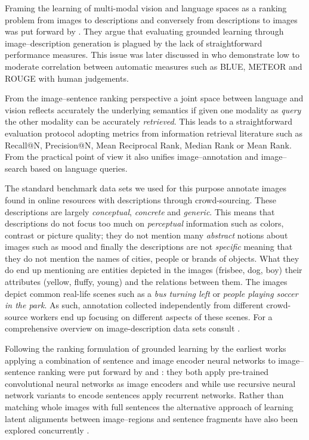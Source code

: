 Framing the learning of multi-modal vision and language spaces as a ranking problem
from images to descriptions and conversely from descriptions to images was
put forward by \cite{hodosh2013framing}.
They argue that evaluating grounded learning through image--description generation
is plagued by the lack of straightforward performance measures.
This issue was later discussed in \cite{elliott2014comparing} who demonstrate low to moderate correlation
between automatic measures such as BLUE, METEOR and ROUGE with human judgements.

From the image--sentence ranking perspective  a joint space between
language and vision reflects accurately
the underlying semantics if given one modality as \emph{query} the other modality
can be accurately \emph{retrieved}.  This leads to a straightforward evaluation protocol
adopting metrics from information retrieval literature such as Recall@N, Precision@N, Mean Reciprocal
Rank, Median Rank or Mean Rank. From the practical point of view it also unifies image--annotation
and image--search based on language queries.

The standard benchmark data sets  we used for this purpose
annotate images found in online resources with descriptions through crowd-sourcing.
These descriptions are largely \emph{conceptual}, \emph{concrete}
and \emph{generic}.
This means that descriptions do not focus too much on \emph{perceptual}
information such as colors, contrast or picture quality; they do not mention
many \emph{abstract} notions about images such as mood and finally the descriptions
are not \emph{specific} meaning that they do not mention the names of cities,
people or brands of objects.
What they do end up mentioning are entities depicted in the images
(frisbee, dog, boy) their attributes (yellow, fluffy, young) and the
relations between them.
The images depict common real-life scenes such as a \emph{bus turning left} or \emph{people
playing soccer in the park}. As such, annotation collected independently from
different crowd-source workers end up focusing on different aspects of
these scenes. For a comprehensive overview on image-description data sets
consult \cite{bernardi2016automatic}.

Following the ranking formulation of grounded learning by \cite{hodosh2013framing}
the earliest works applying a combination of sentence and image encoder neural networks
to image--sentence ranking were put forward by \cite{kiros2014unifying} and \cite{socher2014grounded}:
they both apply pre-trained convolutional neural networks as image encoders and while
\cite{socher2014grounded} use recursive neural network variants to encode sentences
\cite{kiros2014unifying} apply recurrent networks. Rather than matching whole images with full
sentences the alternative approach of learning latent alignments between image--regions and
sentence fragments have also been explored concurrently \citep{karpathy2014deep,karpathy2015deep}.


